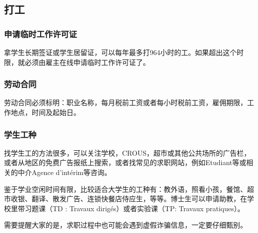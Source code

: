 \subsection{打工}
\subsubsection{申请临时工作许可证}
拿学生长期签证或学生居留证，可以每年最多打964小时的工。如果超出这个时限，就必须由雇主在线申请临时工作许可证了。

\subsubsection{劳动合同}
劳动合同必须标明：职业名称，每月税前工资或者每小时税前工资，雇佣期限，工作地点，时间及起始日。

\subsubsection{学生工种}
找学生工的方法很多，可以关注学校，CROUS，超市或其他公共场所的广告栏，或者从地区的免费广告报纸上搜索，或者找常见的求职⽹站，例如Etudiant等或相关的中介Agence d’intérim等咨询。

鉴于学业空闲时间有限，比较适合大学生的工种有：教外语，照看小孩，餐馆、超市收银、翻译、散发广告、连锁快餐店侍应生，等等。博士生可以申请助教，在学校里带习题课（TD : Travaux dirigés）或者实验课（TP: Travaux pratiques）。

需要提醒⼤家的是，求职过程中也可能会遇到虚假诈骗信息，⼀定要仔细甄别。
